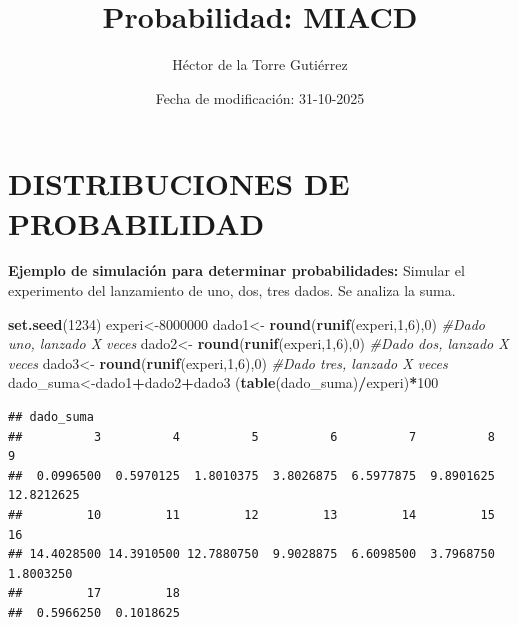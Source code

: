 \documentclass[
]{article}
\title{Probabilidad: MIACD}
\author{Héctor de la Torre Gutiérrez}
\date{Fecha de modificación: 31-10-2025}
\newenvironment{Shaded}{\begin{snugshade}}{\end{snugshade}}
\newcommand{\CommentTok}[1]{\textcolor[rgb]{0.56,0.35,0.01}{\textit{#1}}}
\newcommand{\DecValTok}[1]{\textcolor[rgb]{0.00,0.00,0.81}{#1}}
\newcommand{\FunctionTok}[1]{\textcolor[rgb]{0.13,0.29,0.53}{\textbf{#1}}}
\newcommand{\NormalTok}[1]{#1}
\newcommand{\OtherTok}[1]{\textcolor[rgb]{0.56,0.35,0.01}{#1}}
\newcommand{\SpecialCharTok}[1]{\textcolor[rgb]{0.81,0.36,0.00}{\textbf{#1}}}
\begin{document}
\maketitle

{
\setcounter{tocdepth}{3}
\tableofcontents
}
\section{DISTRIBUCIONES DE
PROBABILIDAD}\label{distribuciones-de-probabilidad}

\textbf{Ejemplo de simulación para determinar probabilidades:} Simular
el experimento del lanzamiento de uno, dos, tres dados. Se analiza la
suma.

\begin{Shaded}
\begin{Highlighting}[]
\FunctionTok{set.seed}\NormalTok{(}\DecValTok{1234}\NormalTok{)}
\NormalTok{experi}\OtherTok{\textless{}{-}}\DecValTok{8000000}
\NormalTok{dado1}\OtherTok{\textless{}{-}} \FunctionTok{round}\NormalTok{(}\FunctionTok{runif}\NormalTok{(experi,}\DecValTok{1}\NormalTok{,}\DecValTok{6}\NormalTok{),}\DecValTok{0}\NormalTok{) }\CommentTok{\#Dado uno, lanzado X veces}
\NormalTok{dado2}\OtherTok{\textless{}{-}} \FunctionTok{round}\NormalTok{(}\FunctionTok{runif}\NormalTok{(experi,}\DecValTok{1}\NormalTok{,}\DecValTok{6}\NormalTok{),}\DecValTok{0}\NormalTok{) }\CommentTok{\#Dado dos, lanzado X veces}
\NormalTok{dado3}\OtherTok{\textless{}{-}} \FunctionTok{round}\NormalTok{(}\FunctionTok{runif}\NormalTok{(experi,}\DecValTok{1}\NormalTok{,}\DecValTok{6}\NormalTok{),}\DecValTok{0}\NormalTok{) }\CommentTok{\#Dado tres, lanzado X veces}
\NormalTok{dado\_suma}\OtherTok{\textless{}{-}}\NormalTok{dado1}\SpecialCharTok{+}\NormalTok{dado2}\SpecialCharTok{+}\NormalTok{dado3}
\NormalTok{(}\FunctionTok{table}\NormalTok{(dado\_suma)}\SpecialCharTok{/}\NormalTok{experi)}\SpecialCharTok{*}\DecValTok{100}
\end{Highlighting}
\end{Shaded}

\begin{verbatim}
## dado_suma
##          3          4          5          6          7          8          9 
##  0.0996500  0.5970125  1.8010375  3.8026875  6.5977875  9.8901625 12.8212625 
##         10         11         12         13         14         15         16 
## 14.4028500 14.3910500 12.7880750  9.9028875  6.6098500  3.7968750  1.8003250 
##         17         18 
##  0.5966250  0.1018625
\end{verbatim}
\end{document}
